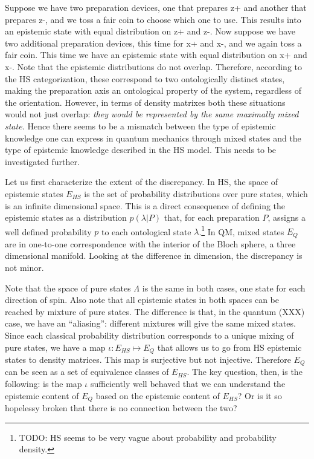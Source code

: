 \documentclass[10pt,twocolumn, nofootinbib]{revtex4-2}
\begin{document}
Suppose we have two preparation devices, one that prepares z+ and another that prepares z-, and we toss a fair coin to choose which one to use. This results into an epistemic state with equal distribution on z+ and z-. Now suppose we have two additional preparation devices, this time for x+ and x-, and we again toss a fair coin. This time we have an epistemic state with equal distribution on x+ and x-. Note that the epistemic distributions do not overlap. Therefore, according to the HS categorization, these correspond to two ontologically distinct states, making the preparation axis an ontological property of the system, regardless of the orientation. However, in terms of density matrixes both these situations would not just overlap: \emph{they would be represented by the same maximally mixed state.} Hence there seems to be a mismatch between the type of epistemic knowledge one can express in quantum mechanics through mixed states and the type of epistemic knowledge described in the HS model. This needs to be investigated further.

Let us first characterize the extent of the discrepancy. In HS, the space of epistemic states $E_{HS}$ is the set of probability distributions over pure states, which is an infinite dimensional space. This is a direct consequence of defining the epistemic states as a distribution $p(\lambda|P)$ that, for each preparation $P$, assigns a well defined probability $p$ to each ontological state $\lambda$.\footnote{TODO: HS seems to be very vague about probability and probability density.} In QM, mixed states $E_{Q}$ are in one-to-one correspondence with the interior of the Bloch sphere, a three dimensional manifold. Looking at the difference in dimension, the discrepancy is not minor.

Note that the space of pure states $\Lambda$ is the same in both cases, one state for each direction of spin. Also note that all epistemic states in both spaces can be reached by mixture of pure states. The difference is that, in the quantum (XXX) case, we have an ``aliasing'': different mixtures will give the same mixed states. Since each classical probability distribution corresponds to a unique mixing of pure states, we have a map $\iota : E_{HS} \mapsto E_{Q}$ that allows us to go from HS epistemic states to density matrices. This map is surjective but not injective. Therefore $E_{Q}$ can be seen as a set of equivalence classes of $E_{HS}$. The key question, then, is the following: is the map $\iota$ sufficiently well behaved that we can understand the epistemic content of $E_{Q}$ based on the epistemic content of $E_{HS}$? Or is it so hopelessy broken that there is no connection between the two?
\end{document}
